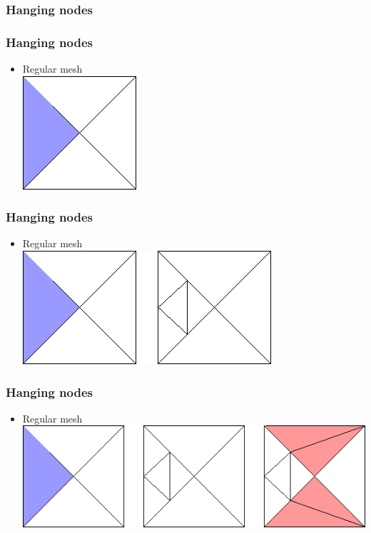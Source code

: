 \begin{frame}
  \frametitle{Hanging nodes}
\end{frame}

\begin{frame}
  \frametitle{Hanging nodes}
\vspace{-2.0cm}
  \begin{itemize}
    \item Regular mesh\\[2mm]    
    \includegraphics[height=0.3\textheight]{regular_a}
  \end{itemize}
\end{frame}

\begin{frame}
\vspace{-2.0cm}
  \frametitle{Hanging nodes}
  \begin{itemize}
    \item Regular mesh\\[2mm]    
    \includegraphics[height=0.3\textheight]{regular_b}
  \end{itemize}
\end{frame}

\begin{frame}
\vspace{-2.0cm}
  \frametitle{Hanging nodes}
  \begin{itemize}
    \item Regular mesh\\[2mm]    
    \includegraphics[height=0.3\textheight]{regular_c}
  \end{itemize}
\end{frame}

